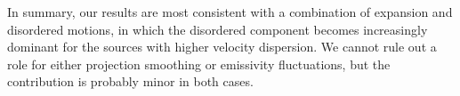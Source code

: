 \documentclass[fleqn,usenatbib, useAMS, a4paper]{mnras}
\newcommand\pos{\ensuremath{_{\mathrm{pos}}}}
\begin{document}
In summary, our results are most consistent with a combination
of expansion and disordered motions, in which the disordered component
becomes increasingly dominant for the sources with higher velocity dispersion.
We cannot rule out a role for either projection smoothing or emissivity fluctuations,
but the contribution is probably minor in both cases. 



\end{document}
